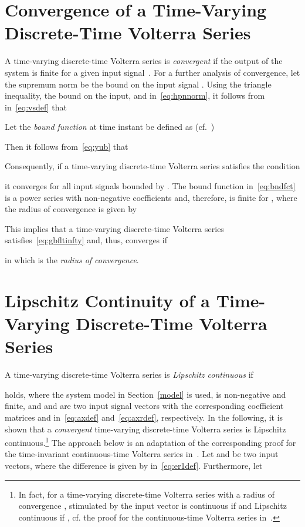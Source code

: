 \documentclass[10pt,twocolumn,twoside]{IEEEtran}
\begin{document}
\appendices


\section{Convergence of a Time-Varying\\ Discrete-Time Volterra Series}
	\label{bibo}

A time-varying discrete-time Volterra series  is \emph{convergent}
if the output of the system is finite for a given input signal~\cite{boyd1984}. For a further
analysis of convergence, let the supremum norm 
be the bound on the input signal . Using the triangle inequality, the bound
 on the input, and  in~\eqref{eq:hpnnorm}, it follows
from  in~\eqref{eq:vsdef} that

Let the \emph{bound function}  at time instant  be defined as (cf.~\cite{boyd1984})

Then it follows from~\eqref{eq:yub} that

Consequently, if a time-varying discrete-time Volterra series 
satisfies the condition

it converges for all input signals bounded by .
The bound function  in~\eqref{eq:bndfct} is a power series with non-negative coefficients
and, therefore, is finite for , where the radius of
convergence  is given by~\cite{rudin1964,boyd1984}

This implies that a time-varying discrete-time Volterra series 
satisfies~\eqref{eq:gbfltinfty} and, thus, converges if 

in which  is the \emph{radius of convergence}.


\section{Lipschitz Continuity of a Time-Varying Discrete-Time Volterra Series}
	\label{errprop}

A time-varying discrete-time Volterra series  is \emph{Lipschitz continuous} if

holds, where the system model in Section~\ref{model} is used,  is non-negative
and finite, and  and  are two input signal vectors
with the corresponding coefficient matrices  and
 in~\eqref{eq:axdef} and~\eqref{eq:axrdef}, respectively.
In the following, it is shown that a \emph{convergent} time-varying discrete-time
Volterra series  is Lipschitz continuous.\footnote{In fact, 
for a time-varying discrete-time Volterra series  with a radius of convergence
,  stimulated by the input vector  is continuous if 
and Lipschitz continuous if , cf. the proof
for the continuous-time Volterra series in~\cite{boyd1984}.}
The approach below is an adaptation of the corresponding proof for
the time-invariant continuous-time Volterra series in~\cite{boyd1984}.
Let  and  be two input vectors, where the difference
is given by  in~\eqref{eq:er1def}. Furthermore, let
\end{document}
